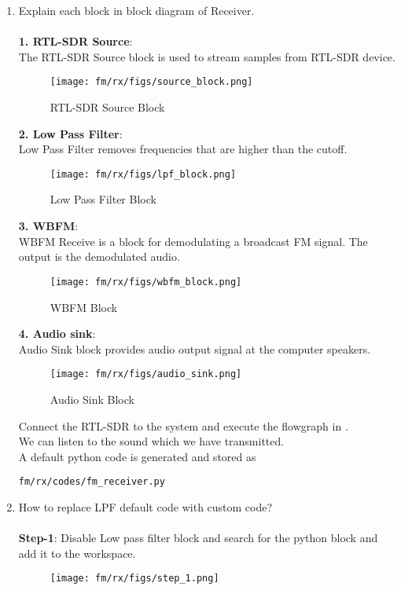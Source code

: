 \begin{enumerate}[label=\arabic*.,ref=\thesection.\theenumi]
\begin{lstlisting}
\end{lstlisting}
\item Explain each block in block diagram of Receiver.\\
	\solution \\
\textbf{1. RTL-SDR Source}:\\
The RTL-SDR Source block is used to stream samples from RTL-SDR device.
\begin{figure}[H]
\centering
\texttt{[image: fm/rx/figs/source\_block.png]}
\caption{RTL-SDR Source Block}
\label{fig:source block}
\end{figure}
\textbf{2. Low Pass Filter}:\\
Low Pass Filter removes frequencies that are higher than the cutoff.
\begin{figure}[H]
\centering
\texttt{[image: fm/rx/figs/lpf\_block.png]}
\caption{Low Pass Filter Block}
\label{fig:lpf}
\end{figure}
\textbf{3. WBFM}:\\
WBFM Receive is a block for demodulating a broadcast FM signal. The output is the demodulated audio.
\begin{figure}[H]
\centering
\texttt{[image: fm/rx/figs/wbfm\_block.png]}
\caption{WBFM Block}
\label{fig:wbfm block}
\end{figure}
\textbf{4. Audio sink}:\\
Audio Sink block provides audio output signal at the computer speakers.
\begin{figure}[H]
\centering
\texttt{[image: fm/rx/figs/audio\_sink.png]}
\caption{Audio Sink Block}
\label{fig:audio sink block}
\end{figure}
Connect the RTL-SDR to the system and execute the flowgraph in .\\
We can listen to the sound which we have transmitted.\\
A default python code is generated and stored as
\begin{lstlisting}
fm/rx/codes/fm_receiver.py
\end{lstlisting}
\item How to replace LPF default code with custom code?\\
\solution \\
\textbf{Step-1}:
Disable Low pass filter block and search for the python block and add it to the workspace.
\begin{figure}[H]
\centering
\texttt{[image: fm/rx/figs/step\_1.png]}

\end{figure}
\end{enumerate}
